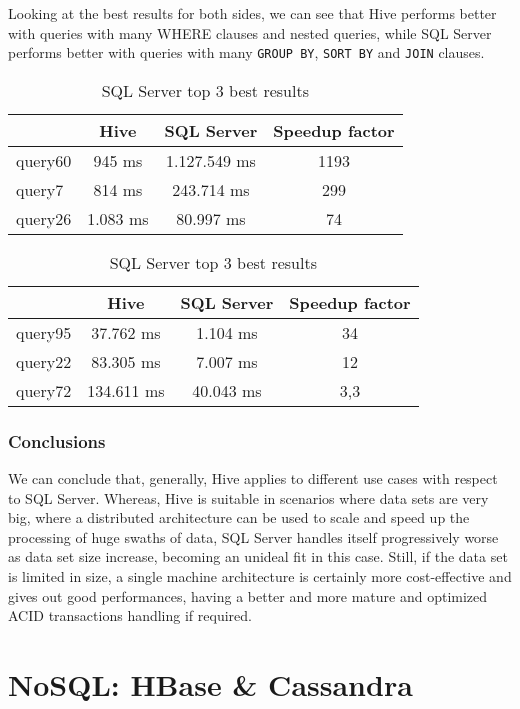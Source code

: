 Looking at the best results for both sides, we can see that Hive performs better with queries with many WHERE clauses and nested queries, while SQL Server performs better with queries with many \texttt{GROUP BY}, \texttt{SORT BY} and \texttt{JOIN} clauses.

\begin{table}[!htb]
    \begin{center}
            \caption{Hive top 3 best results}
        \begin{tabular}{|l|c|c|c|} \hline
            & Hive & SQL Server & Speedup factor\\ \hline
            query60 & 945 ms & 1.127.549 ms & 1193 \\ \hline
            query7 & 814 ms & 243.714 ms & 299 \\ \hline
            query26 & 1.083 ms & 80.997 ms & 74 \\ \hline
        \end{tabular}
    \bigskip
    \caption{SQL Server top 3 best results}
        \begin{tabular}{|l|c|c|c|} \hline
        & Hive & SQL Server & Speedup factor\\ \hline
        query95 & 37.762 ms & 1.104 ms & 34 \\ \hline
        query22 & 83.305 ms & 7.007 ms & 12 \\ \hline
        query72 & 134.611 ms & 40.043 ms & 3,3 \\ \hline
    \end{tabular}
    \end{center}
\end{table}

\subsubsection{Conclusions}

We can conclude that, generally, Hive applies to different use cases with respect to SQL Server. Whereas, Hive is suitable in scenarios where data sets are very big, where a distributed architecture can be used to scale and speed up the processing of huge swaths of data, SQL Server handles itself progressively worse as data set size increase, becoming an unideal fit in this case. Still, if the data set is limited in size, a single machine architecture is certainly more cost-effective and gives out good performances, having a better and more mature and optimized ACID transactions handling if required.

\section{NoSQL: HBase \& Cassandra}

